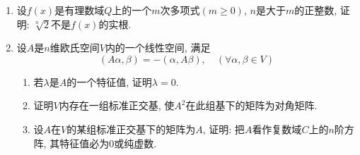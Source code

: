 \documentclass[12pt,a4paper,openany]{book}
\begin{document}
\begin{enumerate}
\item 设$f(x)$是有理数域$Q$上的一个$m$次多项式$(m \ge 0)$, $n$是大于$m$的正整数, 证明: $\sqrt[n]{2}$不是$f(x)$的实根.

\item 设$A$是$n$维欧氏空间$V$内的一个线性空间, 满足
\[
(A\alpha, \beta) = - (\alpha, A\beta), \quad (\forall \alpha, \beta \in V)
\]
\begin{enumerate}
\item 若$\lambda$是$A$的一个特征值, 证明$\lambda = 0$.
\item 证明$V$内存在一组标准正交基, 使$A^2$在此组基下的矩阵为对角矩阵.
\item 设$A$在$V$的某组标准正交基下的矩阵为$A$, 证明: 把$A$看作复数域$C$上的$n$阶方阵, 其特征值必为0或纯虚数.
\end{enumerate}

\end{enumerate}
\end{document}
